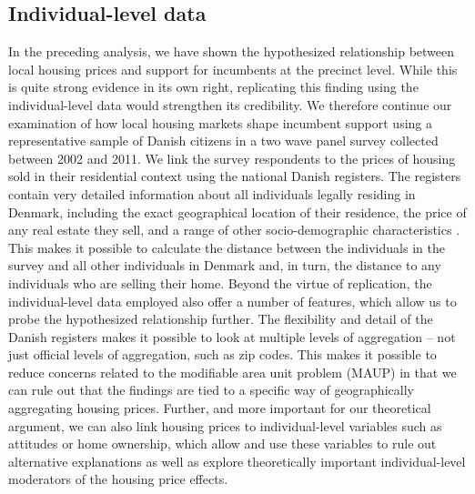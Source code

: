 \documentclass[12pt,a4paper]{article}
\begin{document}
	
	
	\subsection{Individual-level data}\label{individuallevel}
	In the preceding analysis, we have shown the hypothesized relationship between local housing prices and support for incumbents at the precinct level. While this is quite strong evidence in its own right, replicating this finding using the individual-level data would strengthen its credibility. We therefore continue our examination of how local housing markets shape incumbent support using a representative sample of Danish citizens in a two wave panel survey collected between 2002 and 2011. We link the survey respondents to the prices of housing sold in their residential context using the national Danish registers. The registers contain very detailed information about all individuals legally residing in Denmark, including the exact geographical location of their residence, the price of any real estate they sell, and a range of other socio-demographic characteristics \citep{thygesen2011introduction}. This makes it possible to calculate the distance between the individuals in the survey and all other individuals in Denmark and, in turn, the distance to any individuals who are selling their home.
	Beyond the virtue of replication, the individual-level data employed also offer a number of features, which allow us to probe the hypothesized relationship further. The flexibility and detail of the Danish registers makes it possible to look at multiple levels of aggregation -- not just official levels of aggregation, such as zip codes. This makes it possible to reduce concerns related to the modifiable area unit problem (MAUP) in that we can rule out that the findings are tied to a specific way of geographically aggregating housing prices. Further, and more important for our theoretical argument, we can also link housing prices to individual-level variables such as attitudes or home ownership, which allow and use these variables to rule out alternative explanations as well as explore theoretically important individual-level moderators of the housing price effects.
	
\end{document}
